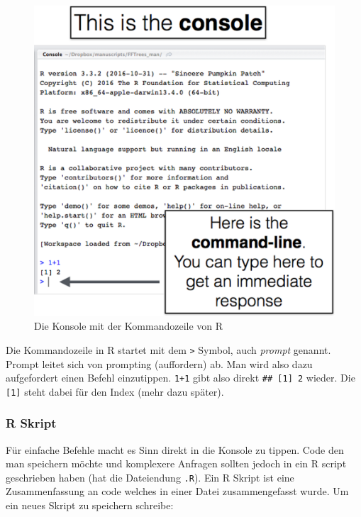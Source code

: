 \documentclass[
]{article}
\begin{document}
\begin{figure}

{\centering \includegraphics[width=7.96in]{images/013} 

}

\caption{Die Konsole mit der Kommandozeile von R}\label{fig:unnamed-chunk-20}
\end{figure}

Die Kommandozeile in R startet mit dem \texttt{\textgreater{}} Symbol, auch \emph{prompt} genannt. Prompt leitet sich von prompting (auffordern) ab. Man wird also dazu aufgefordert einen Befehl einzutippen. \texttt{1+1} gibt also direkt \texttt{\#\#\ {[}1{]}\ 2} wieder. Die \texttt{{[}1{]}} steht dabei für den Index (mehr dazu später).

\hypertarget{r-skript}{%
\subsubsection{R Skript}\label{r-skript}}

Für einfache Befehle macht es Sinn direkt in die Konsole zu tippen. Code den man speichern möchte und komplexere Anfragen sollten jedoch in ein R script geschrieben haben (hat die Dateiendung \texttt{.R}). Ein R Skript ist eine Zusammenfassung an code welches in einer Datei zusammengefasst wurde.
Um ein neues Skript zu speichern schreibe:
\end{document}

